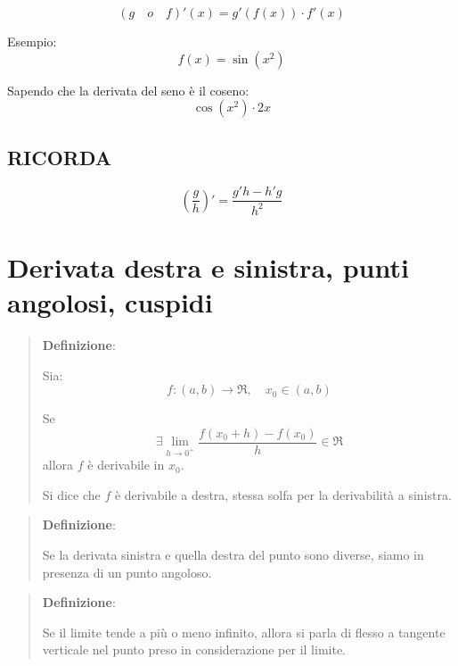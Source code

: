 \documentclass{article}
\begin{document}
\begin{equation*}
    (g \quad o \quad f)'(x) = g'(f(x))\cdot f'(x)
\end{equation*}

Esempio:
\begin{equation*}
    f(x) = \sin(x^2)
\end{equation*}

Sapendo che la derivata del seno è il coseno:
\begin{equation*}
    \cos(x^2)\cdot 2x
\end{equation*}

\subsection{RICORDA}
\begin{equation*}
    (\frac{g}{h})' = \frac{g'h - h'g}{h^2}
\end{equation*}

\section{Derivata destra e sinistra, punti angolosi, cuspidi}

\begin{quote}
    \textbf{Definizione}:


Sia:
\begin{equation*}
    f:(a,b) \rightarrow \Re, \quad x_0 \in (a,b)
\end{equation*}

Se 
\begin{equation*}
    \exists \lim_{h \rightarrow 0^+} \frac{f(x_0 + h) - f(x_0)}{h} \in \Re
\end{equation*}
allora $f$ è derivabile in $x_0$.


Si dice che $f$ è derivabile a destra, stessa solfa per la derivabilità a sinistra.

\end{quote}

\begin{quote}
    \textbf{Definizione}:

    Se la derivata sinistra e quella destra del punto sono diverse, siamo in presenza di un punto angoloso.
        
\end{quote}

\begin{quote}
    

    \textbf{Definizione}:

    Se il limite tende a più o meno infinito, allora si parla di flesso a tangente verticale nel punto preso in considerazione per il limite.

\end{quote}
\end{document}
